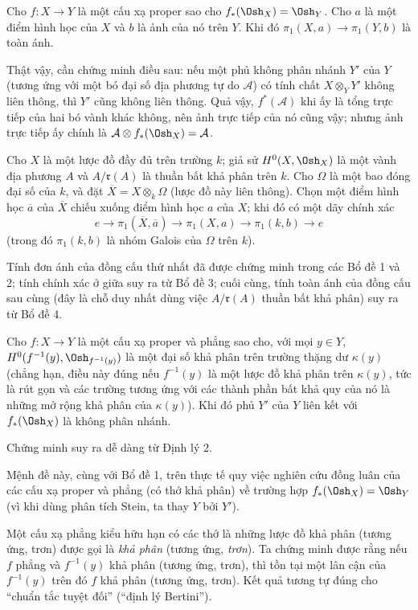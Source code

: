  Cho $f:X\longrightarrow Y$ là một cấu xạ proper sao cho
$f_*(\Osh_X)=\Osh_Y$. Cho $a$ là một điểm hình học của $X$ và $b$ là ảnh của
nó trên $Y$. Khi đó $\pi_1(X,a)\longrightarrow\pi_1(Y,b)$ là toàn ánh.

Thật vậy, cần chứng minh điều sau: nếu một phủ không phân nhánh $Y'$ của $Y$
(tương ứng với một bó đại số địa phương tự do $\mathcal A$) có tính chất
$X\otimes_Y Y'$ không liên thông, thì $Y'$ cũng không liên thông. Quả vậy,
$f^*(\mathcal A)$ khi ấy là tổng trực tiếp của hai bó vành khác không, nên ảnh
trực tiếp của nó cũng vậy; nhưng ảnh trực tiếp ấy chính là
$\mathcal A\otimes f_*(\Osh_X)=\mathcal A$.

 Cho $X$ là một lược đồ đầy đủ trên trường $k$; giả sử
$H^0(X,\Osh_X)$ là một vành địa phương $A$ và $A/\mathfrak r(A)$ là thuần bất
khả phân trên $k$. Cho $\Omega$ là một bao đóng đại số của $k$, và đặt
$\overline X=X\otimes_k\Omega$ (lược đồ này liên thông). Chọn một điểm hình
học $\overline a$ của $\overline X$ chiếu xuống điểm hình học $a$ của $X$;
khi đó có một dãy chính xác
\[
  e\longrightarrow\pi_1(\overline X,\overline a)
  \longrightarrow\pi_1(X,a)
  \longrightarrow\pi_1(k,b)\longrightarrow e
\]
(trong đó $\pi_1(k,b)$ là nhóm Galois của $\Omega$ trên $k$).

Tính đơn ánh của đồng cấu thứ nhất đã được chứng minh trong các Bổ đề 1 và 2;
tính chính xác ở giữa suy ra từ Bổ đề 3; cuối cùng, tính toàn ánh của đồng cấu
sau cùng (đây là chỗ duy nhất dùng việc $A/\mathfrak r(A)$ thuần bất khả phân)
suy ra từ Bổ đề 4.

 Cho $f:X\longrightarrow Y$ là một cấu xạ proper và phẳng
sao cho, với mọi $y\in Y$, $H^0(f^{-1}(y),\Osh_{f^{-1}(y)})$ là một đại số khả
phân trên trường thặng dư $\kappa(y)$ (chẳng hạn, điều này đúng nếu
$f^{-1}(y)$ là một lược đồ khả phân trên $\kappa(y)$, tức là rút gọn và các
trường tương ứng với các thành phần bất khả quy của nó là những mở rộng khả
phân của $\kappa(y)$). Khi đó phủ $Y'$ của $Y$ liên kết với
$f_*(\Osh_X)$ là không phân nhánh.

Chứng minh suy ra dễ dàng từ Định lý 2.

Mệnh đề này, cùng với Bổ đề 1, trên thực tế quy việc nghiên cứu đồng luân của
các cấu xạ proper và phẳng (có thớ khả phân) về trường hợp
$f_*(\Osh_X)=\Osh_Y$ (vì khi dùng phân tích Stein, ta thay $Y$ bởi $Y'$).

 Một cấu xạ phẳng kiểu hữu hạn có các thớ là những lược đồ
khả phân (tương ứng, trơn) được gọi là \emph{khả phân} (tương ứng,
\emph{trơn}). Ta chứng minh được rằng nếu $f$ phẳng và $f^{-1}(y)$ khả phân
(tương ứng, trơn), thì tồn tại một lân cận của $f^{-1}(y)$ trên đó $f$ khả
phân (tương ứng, trơn). Kết quả tương tự đúng cho “chuẩn tắc tuyệt đối”
(“định lý Bertini”).


